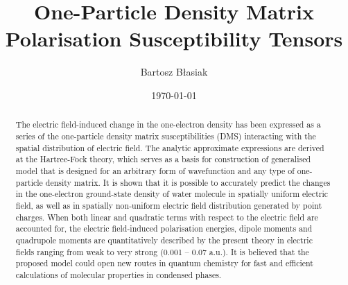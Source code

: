 \documentclass[aip,amsmath,amssymb,reprint,floatfix]{revtex4-1}
\begin{document}

\title{One-Particle Density Matrix Polarisation Susceptibility Tensors}

\author{Bartosz B{\l}asiak}

\date{\today}

\begin{abstract}


The electric field\hyp{}induced change in the one\hyp{}electron density
has been expressed as a series of the one\hyp{}particle density matrix 
susceptibilities (DMS) interacting with the spatial distribution of electric field.
The analytic approximate expressions are derived at the Hartree\hyp{}Fock theory, 
which serves as a basis for construction of generalised model 
that is designed for an arbitrary form of wavefunction and any type of one\hyp{}particle density matrix.
It is shown that it is possible to accurately predict 
the changes in the one\hyp{}electron ground\hyp{}state density of water molecule 
in spatially uniform electric field, as well as in spatially non\hyp{}uniform 
electric field distribution generated by point charges. When both linear 
and quadratic terms with respect to the electric field are accounted for,
the electric field\hyp{}induced polarisation energies, dipole moments 
and quadrupole moments are quantitatively described by the present theory 
in electric fields ranging from weak to very strong (0.001 -- 0.07 a.u.).
It is believed that the proposed model could open new routes in quantum chemistry 
for fast and efficient calculations of molecular properties in condensed phases.
\end{abstract}

\pacs{}%

\maketitle %
\end{document}
